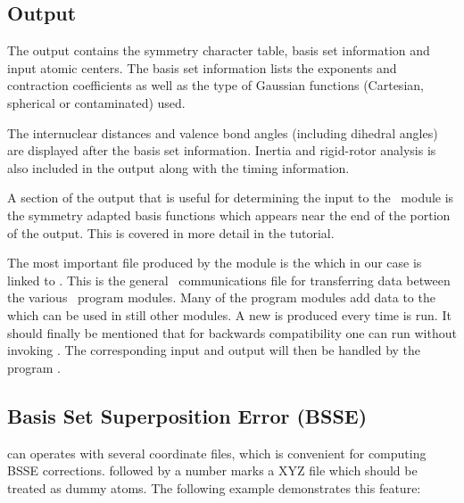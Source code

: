\subsection{ Output}


The  output contains the symmetry character table, basis set 
information and input atomic centers. The basis set information lists the 
exponents and contraction coefficients as well as the type of Gaussian functions
(Cartesian, spherical or contaminated) used.  

The internuclear distances and valence bond angles (including dihedral angles) 
are displayed after the basis set information. 
Inertia and rigid-rotor analysis is also included in the output along with
the timing information.

A section of the output that is useful for determining the input to
the \molcas\ module  is the symmetry adapted basis
functions which appears near the end of the  portion
of the output.  This is covered in more detail in the 
tutorial.

The most important file produced by the  module is the 
 which in our case is linked to .  This is 
the general \molcas\ communications file for transferring data between the
various \molcas\ program modules.  Many of the program modules add
data to the  which can be used in still other modules. A new 
 is produced every time  is run. It should finally
be mentioned that for backwards compatibility one can run  
without invoking . The corresponding input and output will 
then be handled by the program .

\ifmanual
\subsection{Basis Set Superposition Error (BSSE)}

 can operates with several coordinate files, which is convenient
for computing BSSE corrections.  followed by a number marks a XYZ
file which should be treated as dummy atoms. The following example demonstrates
this feature:

